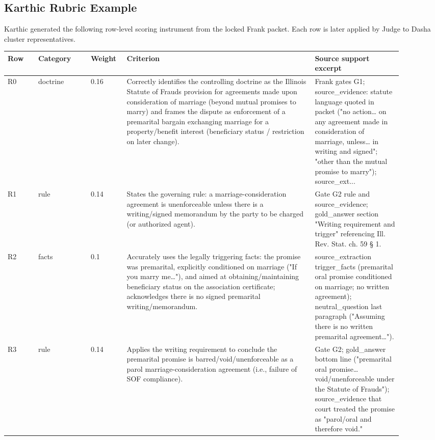 \subsection{Karthic Rubric Example}

Karthic generated the following row-level scoring instrument from the locked Frank packet. Each row is later applied by Judge to Dasha cluster representatives.

\begin{longtable}{p{0.07\linewidth}p{0.12\linewidth}p{0.08\linewidth}p{0.43\linewidth}p{0.20\linewidth}}
\toprule
Row & Category & Weight & Criterion & Source support excerpt \\
\midrule
R0 & doctrine & 0.16 & Correctly identifies the controlling doctrine as the Illinois Statute of Frauds provision for agreements made upon consideration of marriage (beyond mutual promises to marry) and frames the dispute as enforcement of a premarital bargain exchanging marriage for a property/benefit interest (beneficiary status / restriction on later change). & Frank gates G1; source\_evidence: statute language quoted in packet ("no action… on any agreement made in consideration of marriage, unless… in writing and signed"; "other than the mutual promise to marry"); source\_ext... \\
R1 & rule & 0.14 & States the governing rule: a marriage-consideration agreement is unenforceable unless there is a writing/signed memorandum by the party to be charged (or authorized agent). & Gate G2 rule and source\_evidence; gold\_answer section "Writing requirement and trigger" referencing Ill. Rev. Stat. ch. 59 § 1. \\
R2 & facts & 0.1 & Accurately uses the legally triggering facts: the promise was premarital, explicitly conditioned on marriage ("If you marry me…"), and aimed at obtaining/maintaining beneficiary status on the association certificate; acknowledges there is no signed premarital writing/memorandum. & source\_extraction trigger\_facts (premarital oral promise conditioned on marriage; no written agreement); neutral\_question last paragraph ("Assuming there is no written premarital agreement…"). \\
R3 & rule & 0.14 & Applies the writing requirement to conclude the premarital promise is barred/void/unenforceable as a parol marriage-consideration agreement (i.e., failure of SOF compliance). & Gate G2; gold\_answer bottom line ("premarital oral promise… void/unenforceable under the Statute of Frauds"); source\_evidence that court treated the promise as "parol/oral and therefore void." \\

\end{longtable}
